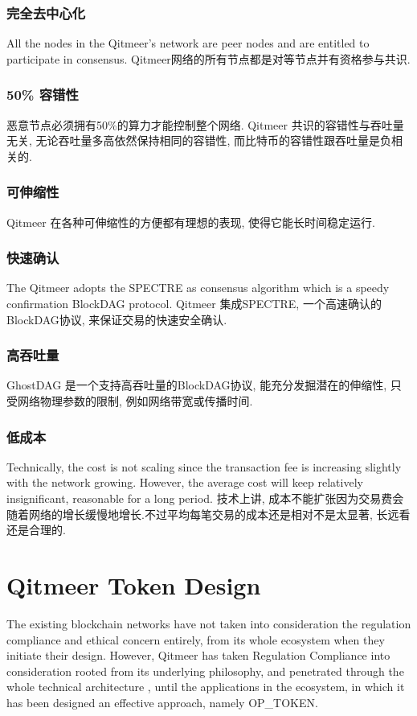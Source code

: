 \documentclass[a4paper,11pt]{article}
\begin{document}
\subsubsection*{完全去中心化}
All the nodes in the Qitmeer’s network are peer nodes and are entitled to participate in consensus.
Qitmeer网络的所有节点都是对等节点并有资格参与共识.

\subsubsection*{50\% 容错性}
恶意节点必须拥有50\%的算力才能控制整个网络. Qitmeer 共识的容错性与吞吐量无关, 无论吞吐量多高依然保持相同的容错性, 而比特币的容错性跟吞吐量是负相关的.

\subsubsection{可伸缩性}
Qitmeer 在各种可伸缩性的方便都有理想的表现, 使得它能长时间稳定运行.

\subsubsection*{快速确认}
The Qitmeer adopts the SPECTRE as consensus algorithm which is a speedy confirmation BlockDAG protocol. 
Qitmeer 集成SPECTRE, 一个高速确认的BlockDAG协议, 来保证交易的快速安全确认.
\subsubsection*{高吞吐量}
GhostDAG 是一个支持高吞吐量的BlockDAG协议, 能充分发掘潜在的伸缩性, 只受网络物理参数的限制, 例如网络带宽或传播时间.

\subsubsection*{低成本}
Technically, the cost is not scaling since the transaction fee is increasing slightly with the network growing. However, the average cost will keep relatively insignificant, reasonable for a long period.  
技术上讲, 成本不能扩张因为交易费会随着网络的增长缓慢地增长.不过平均每笔交易的成本还是相对不是太显著, 长远看还是合理的.


\section{Qitmeer Token Design}
The existing blockchain networks have not taken into consideration the  regulation compliance and ethical concern entirely, from its whole ecosystem when they initiate their design. However, Qitmeer has taken Regulation Compliance into consideration rooted from its underlying philosophy, and penetrated through the whole technical architecture , until the applications in the ecosystem, in which it has been designed an effective approach, namely OP_TOKEN.
\end{document}
